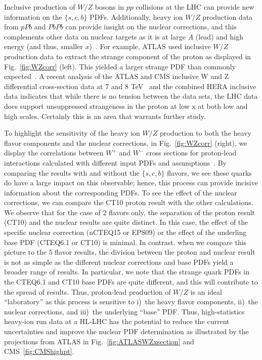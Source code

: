 \documentclass[../report.tex]{subfiles}
\begin{document}
%
%
Inclusive production of $W/Z$ bosons in $pp$ collisions at the LHC  can provide
new information on the $\{s,c,b\}$ PDFs.
Additionally, heavy ion $W/Z$ production data from $pPb$ and $PbPb$ can provide insight on 
the nuclear corrections, 
and this complements other data on nuclear targets as it is at large $A$ (lead) and high energy (and thus, smaller $x$)~\cite{Aad:2015gta,TheATLAScollaboration:2015lnm,Khachatryan:2015pzs,Khachatryan:2015hha,CMS:2018ilq,Aaij:2014pvu,Alice:2016wka,CMS:2018ilq}.
%
%
For example, ATLAS used  inclusive $W/Z$ production data to extract the strange component of the proton 
as displayed in Fig.~\ref{fig:WZcorr} (left). This yielded a larger strange PDF than commonly expected~\cite{Aad:2012sb,Aaboud:2016btc}. 
%
A recent analysis of the ATLAS and CMS inclusive W and Z differential
cross-section data at 7 and 8 TeV~\cite{Cooper-Sarkar:2018ufj} and the combined HERA inclusive data indicates that while there is no tension between the
data sets, the  LHC data does support unsuppressed strangeness
in the proton at low x at both low and high scales. 
Certainly this is an area that warrants further study. 

To highlight the sensitivity of the heavy ion $W/Z$ production to both the 
heavy flavor components and the nuclear corrections, 
in Fig.~\ref{fig:WZcorr} (right), we display the correlations between $W^+$ and $W^-$ 
cross sections for proton-lead interactions calculated with different input PDFs and assumptions~\cite{Kusina:2016fxy}.
%
By comparing the results with and without the $\{s,c,b\}$ flavors, we see these quarks do have a
large impact on this observable;  hence, this process can provide incisive information about the 
corresponding PDFs. 
%
To see the effect of the nuclear corrections, we can compare the CT10 proton result with the other calculations. 
%
We observe that for the case of 2 flavors only, the separation of the proton result  (CT10) and the 
nuclear results are quite distinct. In this case, the effect of the specific nuclear correction (nCTEQ15 or EPS09)
or the effect of the underling base PDF (CTEQ6.1 or CT10) is minimal. 
%
In contrast, when we compare this picture to the 5 flavor results, the division between the proton and nuclear
result is not as simple as the different nuclear corrections and base PDFs yield a broader range of results. 
In particular, we note that the strange quark PDFs in the CTEQ6.1 and CT10 base PDFs are quite different, and this will contribute to the spread of results. 
%
Thus, proton-lead  production of $W/Z$  is an ideal ``laboratory'' 
as this process is sensitive to i)~the heavy flavor components,
ii)~the nuclear corrections, and iii)~the underlying ``base'' PDF. 
%
Thus, high-statistics heavy-ion run data at a HL-LHC has the potential 
to reduce  the current uncertainties and improve the nuclear PDF determination as illustrated by the projections from ATLAS in Fig.~\ref{fig:ATLASWZxsection} and CMS~\ref{fig:CMShighpt}.
\end{document}

